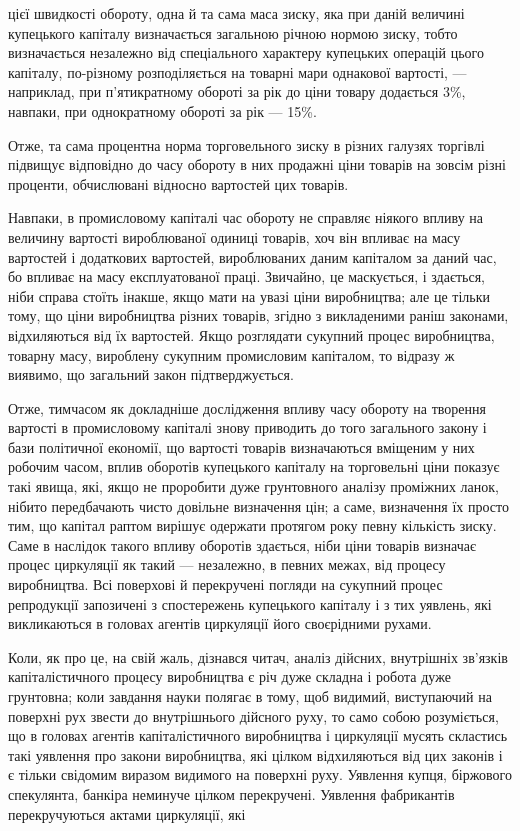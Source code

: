 \parcont{}  %
цієї швидкості обороту, одна й та сама маса зиску, яка при даній
величині купецького капіталу визначається загальною річною
нормою зиску, тобто визначається незалежно від спеціального
характеру купецьких операцій цього капіталу, по-різному розподіляється
на товарні мари однакової вартості, — наприклад, при п’ятикратному
обороті за рік до ціни товару додається  \deq{} 3\%,
навпаки, при однократному обороті за рік — 15\%.

Отже, та сама процентна норма торговельного зиску в різних
галузях торгівлі підвищує відповідно до часу обороту в них
продажні ціни товарів на зовсім різні проценти, обчислювані
відносно вартостей цих товарів.

Навпаки, в промисловому капіталі час обороту не справляє
ніякого впливу на величину вартості вироблюваної одиниці товарів,
хоч він впливає на масу вартостей і додаткових вартостей,
вироблюваних даним капіталом за даний час, бо впливає на
масу експлуатованої праці. Звичайно, це маскується, і здається,
ніби справа стоїть інакше, якщо мати на увазі ціни виробництва;
але це тільки тому, що ціни виробництва різних товарів, згідно
з викладеними раніш законами, відхиляються від їх вартостей.
Якщо розглядати сукупний процес виробництва, товарну масу,
вироблену сукупним промисловим капіталом, то відразу ж виявимо,
що загальний закон підтверджується.

Отже, тимчасом як докладніше дослідження впливу часу
обороту на творення вартості в промисловому капіталі знову
приводить до того загального закону і бази політичної економії,
що вартості товарів визначаються вміщеним у них робочим
часом, вплив оборотів купецького капіталу на торговельні ціни
показує такі явища, які, якщо не проробити дуже грунтовного аналізу
проміжних ланок, нібито передбачають чисто довільне визначення
цін; а саме, визначення їх просто тим, що капітал раптом
вирішує одержати протягом року певну кількість зиску. Саме
в наслідок такого впливу оборотів здається, ніби ціни товарів
визначає процес циркуляції як такий — незалежно, в певних межах,
від процесу виробництва. Всі поверхові й перекручені
погляди на сукупний процес репродукції запозичені з спостережень
купецького капіталу і з тих уявлень, які викликаються
в головах агентів циркуляції його своєрідними рухами.

Коли, як про це, на свій жаль, дізнався читач, аналіз дійсних,
внутрішніх зв’язків капіталістичного процесу виробництва є
річ дуже складна і робота дуже грунтовна; коли завдання
науки полягає в тому, щоб видимий, виступаючий на поверхні
рух звести до внутрішнього дійсного руху, то само собою
розуміється, що в головах агентів капіталістичного виробництва
і циркуляції мусять скластись такі уявлення про закони виробництва,
які цілком відхиляються від цих законів і є тільки свідомим
виразом видимого на поверхні руху. Уявлення купця,
біржового спекулянта, банкіра неминуче цілком перекручені.
Уявлення фабрикантів перекручуються актами циркуляції, які
\parbreak{}  %

